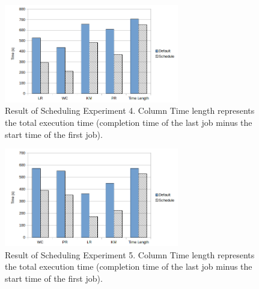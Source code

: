 \begin{figure}[!t]
\centering
\captionsetup{justification=centering}
\includegraphics[width=3in]{exp4.png}
\caption{Result of Scheduling Experiment 4. Column Time length represents the total execution time (completion time of the last job minus the start time of the first job).}
\label{exp4}
\end{figure}





\begin{figure}[!t]
\centering
\captionsetup{justification=centering}
\includegraphics[width=3in]{exp5.png}
\caption{Result of Scheduling Experiment 5. Column Time length represents the total execution time (completion time of the last job minus the start time of the first job).}
\label{exp5}
\end{figure}

